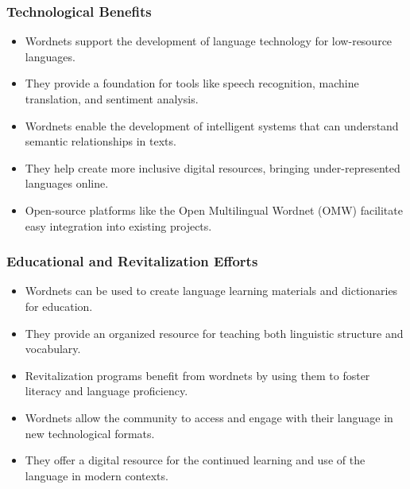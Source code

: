 \documentclass[xetex]{beamer}  %
\begin{document}
\begin{frame}
\frametitle{Technological Benefits}

\begin{itemize}
    \item Wordnets support the development of language technology for low-resource languages.
    \item They provide a foundation for tools like speech recognition, machine translation, and sentiment analysis.
    \item Wordnets enable the development of intelligent systems that can understand semantic relationships in texts.
    \item They help create more inclusive digital resources, bringing under-represented languages online.
    \item Open-source platforms like the Open Multilingual Wordnet (OMW) facilitate easy integration into existing projects.
\end{itemize}
\end{frame}

\begin{frame}
\frametitle{Educational and Revitalization Efforts}

\begin{itemize}
    \item Wordnets can be used to create language learning materials and dictionaries for education.
    \item They provide an organized resource for teaching both linguistic structure and vocabulary.
    \item Revitalization programs benefit from wordnets by using them to foster literacy and language proficiency.
    \item Wordnets allow the community to access and engage with their language in new technological formats.
    \item They offer a digital resource for the continued learning and use of the language in modern contexts.
\end{itemize}
\end{frame}
\end{document}
